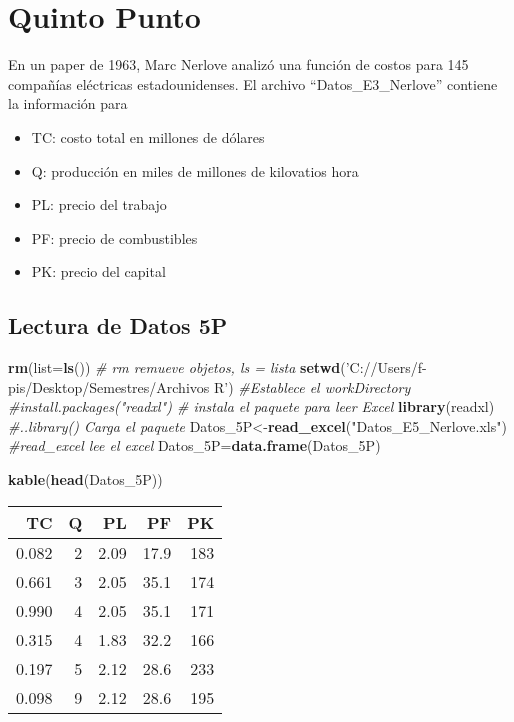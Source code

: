 \documentclass[
]{article}
\newenvironment{Shaded}{\begin{snugshade}}{\end{snugshade}}
\newcommand{\CommentTok}[1]{\textcolor[rgb]{0.56,0.35,0.01}{\textit{#1}}}
\newcommand{\DataTypeTok}[1]{\textcolor[rgb]{0.13,0.29,0.53}{#1}}
\newcommand{\KeywordTok}[1]{\textcolor[rgb]{0.13,0.29,0.53}{\textbf{#1}}}
\newcommand{\NormalTok}[1]{#1}
\newcommand{\StringTok}[1]{\textcolor[rgb]{0.31,0.60,0.02}{#1}}
\providecommand{\tightlist}{%
  \setlength{\itemsep}{0pt}\setlength{\parskip}{0pt}}
\begin{document}
\hypertarget{quinto-punto}{%
\section{Quinto Punto}\label{quinto-punto}}

En un paper de 1963, Marc Nerlove analizó una función de costos para 145
compañías eléctricas estadounidenses. El archivo ``Datos\_E3\_Nerlove''
contiene la información para

\begin{itemize}
\tightlist
\item
  TC: costo total en millones de dólares
\item
  Q: producción en miles de millones de kilovatios hora
\item
  PL: precio del trabajo
\item
  PF: precio de combustibles
\item
  PK: precio del capital
\end{itemize}

\hypertarget{lectura-de-datos-5p}{%
\subsection{Lectura de Datos 5P}\label{lectura-de-datos-5p}}

\begin{Shaded}
\begin{Highlighting}[]
\KeywordTok{rm}\NormalTok{(}\DataTypeTok{list=}\KeywordTok{ls}\NormalTok{()) }\CommentTok{# rm remueve objetos, ls = lista}
\KeywordTok{setwd}\NormalTok{(}\StringTok{'C://Users/f-pis/Desktop/Semestres/Archivos R'}\NormalTok{) }\CommentTok{#Establece el workDirectory}
\CommentTok{#install.packages("readxl") # instala el paquete para leer Excel }
\KeywordTok{library}\NormalTok{(readxl) }\CommentTok{#..library() Carga el paquete }
\NormalTok{Datos_5P<-}\KeywordTok{read_excel}\NormalTok{(}\StringTok{"Datos_E5_Nerlove.xls"}\NormalTok{) }\CommentTok{#read_excel lee el excel}
\NormalTok{Datos_5P=}\KeywordTok{data.frame}\NormalTok{(Datos_5P)}

\KeywordTok{kable}\NormalTok{(}\KeywordTok{head}\NormalTok{(Datos_5P))}
\end{Highlighting}
\end{Shaded}

\begin{longtable}[]{@{}rrrrr@{}}
\toprule
TC & Q & PL & PF & PK\tabularnewline
\midrule
\endhead
0.082 & 2 & 2.09 & 17.9 & 183\tabularnewline
0.661 & 3 & 2.05 & 35.1 & 174\tabularnewline
0.990 & 4 & 2.05 & 35.1 & 171\tabularnewline
0.315 & 4 & 1.83 & 32.2 & 166\tabularnewline
0.197 & 5 & 2.12 & 28.6 & 233\tabularnewline
0.098 & 9 & 2.12 & 28.6 & 195\tabularnewline
\bottomrule
\end{longtable}
\end{document}

